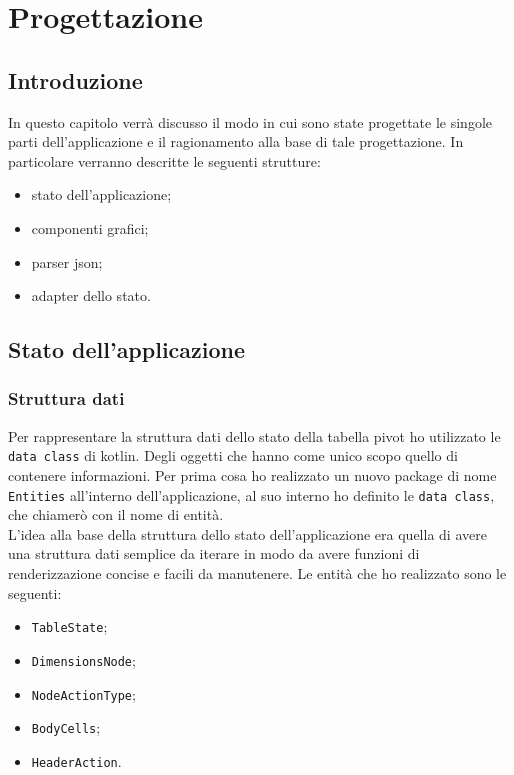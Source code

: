 
\chapter{Progettazione}
\label{cap:progettazione}


\section{Introduzione}
In questo capitolo verrà discusso il modo in cui sono state progettate le singole parti dell'applicazione e il ragionamento alla base di tale progettazione. In particolare verranno descritte le seguenti strutture:
\begin{itemize}
	\item stato dell'applicazione;
	\item componenti grafici;
	\item parser json;
	\item adapter dello stato.
\end{itemize}

\section{Stato dell'applicazione}
\subsection{Struttura dati}
Per rappresentare la struttura dati dello stato della tabella pivot ho utilizzato le \verb|data class| di kotlin. Degli oggetti che hanno come unico scopo quello di contenere informazioni. Per prima cosa ho realizzato un nuovo package di nome \verb|Entities| all'interno dell'applicazione, al suo interno ho definito le \verb|data class|, che chiamerò con il nome di entità. \\
L'idea alla base della struttura dello stato dell'applicazione era quella di avere una struttura dati semplice da iterare in modo da avere funzioni di renderizzazione concise e facili da manutenere. Le entità che ho realizzato sono le seguenti:
\begin{itemize}
	\item \verb|TableState|;
	\item \verb|DimensionsNode|;
	\item \verb|NodeActionType|;
	\item \verb|BodyCells|;
	\item \verb|HeaderAction|.
\end{itemize}

